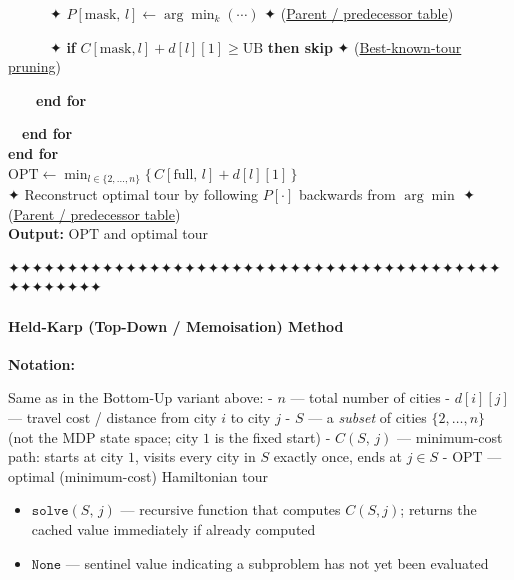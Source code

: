 \documentclass[11pt]{article}
\providecommand{\tightlist}{%
      \setlength{\itemsep}{0pt}\setlength{\parskip}{0pt}}
\begin{document}
\begin{pseudobox}
\strut ~~~~~~✦ \(P[\text{mask},\, l] \leftarrow \arg\min_k(\cdots)\) ✦
(\hyperref[trick-1-3-4]{Parent / predecessor table})\\
\strut ~~~~~~✦ \textbf{if}
\(C[\text{mask},l] + d[l][1] \geq \mathrm{UB}\) \textbf{then skip} ✦
(\hyperref[trick-1-3-6]{Best-known-tour pruning})\\
\strut ~~~~\textbf{end for}\\
\strut ~~\textbf{end for}\\
\textbf{end for}\\
\(\text{OPT} \leftarrow \min_{l\in\{2,\ldots,n\}} \bigl\{\, C[\text{full},\,l] + d[l][1] \,\bigr\}\)\\
✦ Reconstruct optimal tour by following \(P[\cdot]\) backwards from
\(\arg\min\) ✦ (\hyperref[trick-1-3-4]{Parent / predecessor table})\\
\textbf{Output:} \(\text{OPT}\) and optimal tour

\end{pseudobox}

    ✦✦✦✦✦✦✦✦✦✦✦✦✦✦✦✦✦✦✦✦✦✦✦✦✦✦✦✦✦✦✦✦✦✦✦✦✦✦✦✦✦✦✦✦✦✦✦✦✦✦

    \label{held-karp-top-down}

    \paragraph{Held-Karp (Top-Down / Memoisation)
Method}\label{held-karp-top-down-memoisation-method}

    \textbf{Notation:}

Same as in the Bottom-Up variant above: - \(n\) --- total number of
cities - \(d[i][j]\) --- travel cost / distance from city \(i\) to city
\(j\) - \(S\) --- a \emph{subset} of cities \(\{2,\ldots,n\}\) (not the
MDP state space; city \(1\) is the fixed start) - \(C(S,\,j)\) ---
minimum-cost path: starts at city \(1\), visits every city in \(S\)
exactly once, ends at \(j \in S\) - \(\text{OPT}\) --- optimal
(minimum-cost) Hamiltonian tour

\begin{itemize}
\tightlist
\item
  \(\texttt{solve}(S,\,j)\) --- recursive function that computes
  \(C(S,j)\); returns the cached value immediately if already computed
\item
  \(\texttt{None}\) --- sentinel value indicating a subproblem has not
  yet been evaluated
\end{itemize}

    \label{intro-1-4}
\end{document}
